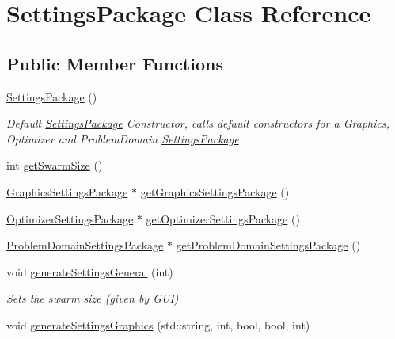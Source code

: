 \hypertarget{class_settings_package}{}\section{Settings\+Package Class Reference}
\label{class_settings_package}
\subsection*{Public Member Functions}
\begin{DoxyCompactItemize}
\item 
\hyperlink{class_settings_package_a387aa321903917fad11b1897f7c4d357}{Settings\+Package} ()\hypertarget{class_settings_package_a387aa321903917fad11b1897f7c4d357}{}\label{class_settings_package_a387aa321903917fad11b1897f7c4d357}

\begin{DoxyCompactList}\small\item\em Default \hyperlink{class_settings_package}{Settings\+Package} Constructor, calls default constructors for a Graphics, Optimizer and Problem\+Domain \hyperlink{class_settings_package}{Settings\+Package}. \end{DoxyCompactList}\item 
int \hyperlink{class_settings_package_a2ea450e25107e41782206c5fc58c33f3}{get\+Swarm\+Size} ()
\item 
\hyperlink{class_graphics_settings_package}{Graphics\+Settings\+Package} $\ast$ \hyperlink{class_settings_package_a7eb1432a2fbda1d204ef73b47b46d1e2}{get\+Graphics\+Settings\+Package} ()
\item 
\hyperlink{class_optimizer_settings_package}{Optimizer\+Settings\+Package} $\ast$ \hyperlink{class_settings_package_a6fa4b42272cf9c8d3847c038bf591914}{get\+Optimizer\+Settings\+Package} ()
\item 
\hyperlink{class_problem_domain_settings_package}{Problem\+Domain\+Settings\+Package} $\ast$ \hyperlink{class_settings_package_a343a97ef7424b400ab17480b77051466}{get\+Problem\+Domain\+Settings\+Package} ()
\item 
void \hyperlink{class_settings_package_aa2c0392e2df98086e2ef64b640e2aab4}{generate\+Settings\+General} (int)
\begin{DoxyCompactList}\small\item\em Sets the swarm size (given by G\+UI) \end{DoxyCompactList}\item 
void \hyperlink{class_settings_package_a47d46d976eb64fb341a3c49d65936ea8}{generate\+Settings\+Graphics} (std\+::string, int, bool, bool, int)\hypertarget{class_settings_package_a47d46d976eb64fb341a3c49d65936ea8}{}\label{class_settings_package_a47d46d976eb64fb341a3c49d65936ea8}


\end{DoxyCompactItemize}
